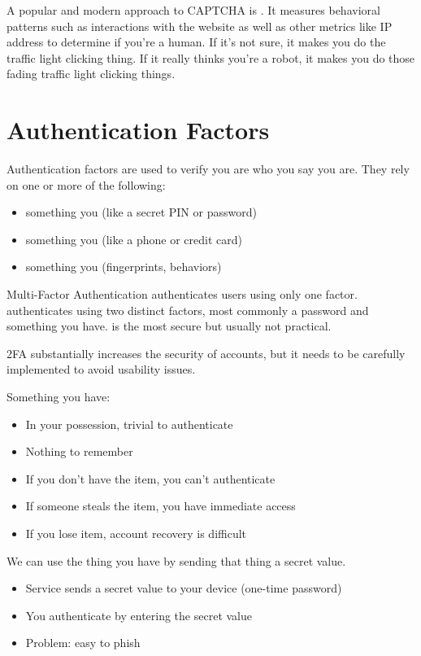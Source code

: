 \documentclass[code]{amznotes}
\begin{document}
A popular and modern approach to CAPTCHA is . It measures behavioral patterns such as interactions with the website as well as other metrics like IP address to determine if you're a human. If it's not sure, it makes you do the traffic light clicking thing. If it really thinks you're a robot, it makes you do those fading traffic light clicking things.


\section{Authentication Factors}
Authentication factors are used to verify you are who you say you are. They rely on one or more of the following:
\begin{itemize}[noitemsep]
    \item something you  (like a secret PIN or password)
    \item something you  (like a phone or credit card)
    \item something you  (fingerprints, behaviors)
\end{itemize}

\begin{dfnbox}{Multi-Factor Authentication}{}
     authenticates users using only one factor.  authenticates using two distinct factors, most commonly a password and something you have.  is the most secure but usually not practical.
\end{dfnbox}

2FA substantially increases the security of accounts, but it needs to be carefully implemented to avoid usability issues.

Something you have:
\begin{itemize}[noitemsep]
    \item In your possession, trivial to authenticate
    \item Nothing to remember
    \item If you don't have the item, you can't authenticate
    \item If someone steals the item, you have immediate access
    \item If you lose item, account recovery is difficult
\end{itemize}

We can use the thing you have by sending that thing a secret value.
\begin{itemize}[noitemsep]
    \item Service sends a secret value to your device (one-time password)
    \item You authenticate by entering the secret value
    \item Problem: easy to phish
\end{itemize}
\end{document}
